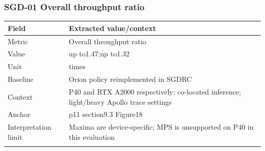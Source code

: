 \subsubsection*{SGD-01 Overall throughput ratio}
\begin{longtable}{>{\raggedright\arraybackslash}p{}>{\raggedright\arraybackslash}p{}}
\toprule
\textbf{Field} & \textbf{Extracted value/context}\\\midrule\endhead
Metric & Overall throughput ratio\\\addlinespace
Value & up to1.47;\allowbreak{}up to1.32\\\addlinespace
Unit & times\\\addlinespace
Baseline & Orion policy reimplemented in SGDRC\\\addlinespace
Context & P40 and RTX A2000 respectively;\allowbreak{} co-located inference;\allowbreak{} light/heavy Apollo trace settings\\\addlinespace
Anchor & p11 section9.3 Figure18\\\addlinespace
Interpretation limit & Maxima are device-specific;\allowbreak{} MPS is unsupported on P40 in this evaluation\\\addlinespace
\bottomrule\end{longtable}

